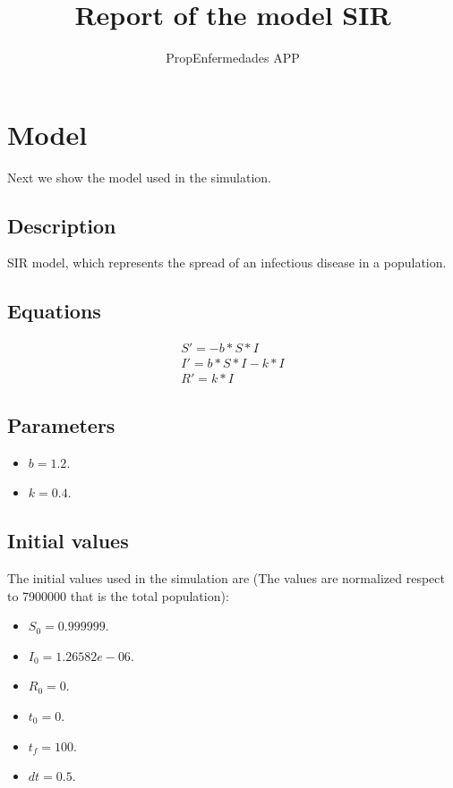 \documentclass{article}
\title{Report of the model SIR}
\author{PropEnfermedades APP}
\date{}
\begin{document}
\maketitle
\section{Model}
Next we show the model used in the simulation.
\subsection*{Description}
SIR model, which represents the spread of an infectious disease in a population.
\subsection*{Equations}
\begin{equation}
\begin{split}
S' = -b * S * I \\ I' = b * S * I - k * I \\ R' = k * I
\end{split}
\end{equation}
\subsection*{Parameters}
\begin{itemize}
\item $b = 1.2$. 
\item $k = 0.4$. 
\end{itemize}
\subsection*{Initial values}
The initial values used in the simulation are (The values are normalized respect to 7900000 that is the total population):
\begin{itemize}
\item $S_0 = 0.999999$. 
\item $I_0 = 1.26582e-06$. 
\item $R_0 = 0$. 
\item $t_0 = 0$. 
\item $t_f = 100$. 
\item $dt = 0.5$. 
\end{itemize}
\end{document}
